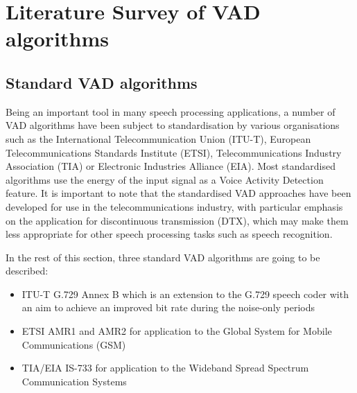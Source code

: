 
\chapter{Literature Survey of VAD algorithms} %

\label{Chapter2} %



\section{Standard VAD algorithms}

Being an important tool in many speech processing applications, a number of VAD algorithms have been subject to standardisation by various organisations such as the International Telecommunication Union (ITU-T), European Telecommunications Standards Institute (ETSI), Telecommunications Industry Association (TIA) or Electronic Industries Alliance (EIA). Most standardised algorithms use the energy of the input signal as a Voice Activity Detection feature. It is important to note that the standardised VAD approaches have been developed for use in the telecommunications industry, with particular emphasis on the application for discontinuous transmission (DTX), which may make them less appropriate for other speech processing tasks such as speech recognition.

In the rest of this section, three standard VAD algorithms are going to be described:
\begin{itemize}
\item ITU-T G.729 Annex B \citep{G729} which is an extension to the G.729 speech coder with an aim to achieve an improved bit rate during the noise-only periods
\item ETSI AMR1 and AMR2 \cite{AMR} for application to the Global System for Mobile Communications (GSM)
\item TIA/EIA IS-733 \cite{IS733} for application to the Wideband Spread Spectrum Communication Systems
\end{itemize}


